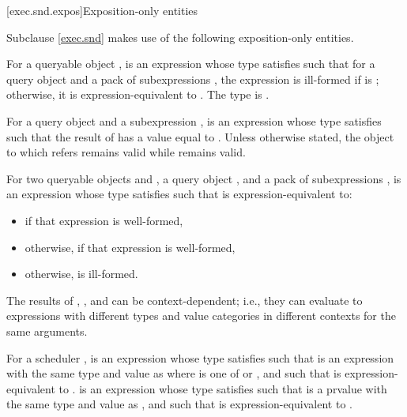 [exec.snd.expos]{Exposition-only entities}

\pnum
Subclause \ref{exec.snd} makes use of the following exposition-only entities.

\pnum
{}%
For a queryable object ,
 is an expression
whose type satisfies 
such that for a query object  and
a pack of subexpressions ,
the expression  is ill-formed
if  is ;
otherwise, it is expression-equivalent to .
%
The type  is
.

\pnum
For a query object  and a subexpression ,
 is an expression 
whose type satisfies 
such that the result of  has
a value equal to .
Unless otherwise stated,
the object to which  refers remains valid
while  remains valid.

\pnum
For two queryable objects  and ,
a query object , and
a pack of subexpressions ,
 is an expression 
whose type satisfies 
such that  is expression-equivalent to:
\begin{itemize}
\item
{} if that expression is well-formed,
\item
otherwise,  if that expression is well-formed,
\item
otherwise,  is ill-formed.
\end{itemize}

\pnum
The results of , , and 
can be context-dependent;
i.e., they can evaluate to expressions
with different types and value categories
in different contexts for the same arguments.

\pnum
For a scheduler ,
 is an expression 
whose type satisfies 
such that  is
an expression with the same type and value as 
where  is one of  or , and
such that  is expression-equivalent to
.
 is an expression 
whose type satisfies 
such that  is a prvalue
with the same type and value as , and
such that  is expression-equivalent to
.

